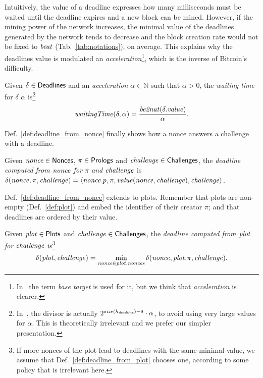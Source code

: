 %
Intuitively, the value of a deadline expresses how many milliseconds
must be waited until the deadline expires and a new block can be mined.
However, if the mining power of the network increases, the minimal value of the deadlines
generated by the network tends to decrease and the block creation rate would not be
fixed to ${\mathit{beat}}$ (Tab.~\ref{tab:notations}), on average.
This explains why the deadlines value is modulated \wrt an
\emph{acceleration}\footnote{In~\cite{SignumPlotting} the term
\emph{base target} is used for it, but we think that \emph{acceleration} is clearer.},
which is the inverse of Bitcoin's difficulty.
%
\begin{definition}\label{def:deadline_waiting_time}
  Given $\delta\in{\mathsf{Deadlines}}$ and an \emph{acceleration}
  $\alpha\in\mathbb{N}$ such that $\alpha>0$, the
  \emph{waiting time} for $\delta$ \wrt $\alpha$ is\footnote{
  In~\cite{SignumPlotting}, the divisor is actually
  $2^{{\mathit{size}}(h_{\mathit{deadline}})-8}\cdot\alpha$, to avoid using very large values for
  $\alpha$. This is theoretically irrelevant and we prefer our simpler presentation.
  }
  \[
  {\mathit{waitingTime}}(\delta,\alpha)
  =\frac{{\mathit{be2nat}}(\delta.\mathit{value})}{\alpha}.
  \]
\end{definition}
%
Def.~\ref{def:deadline_from_nonce} finally shows how a nonce answers a challenge with a deadline.
%
\begin{definition}[$\delta(\nonce,\pi,\challenge)$]\label{def:deadline_from_nonce}
  Given ${\mathit{nonce}}\in{\mathsf{Nonces}}$, $\pi\in{\mathsf{Prologs}}$ and ${\mathit{challenge}}\in{\mathsf{Challenges}}$, the
  \emph{deadline computed from ${\mathit{nonce}}$ for $\pi$ and ${\mathit{challenge}}$} is
  $\delta({\mathit{nonce}},\pi,{\mathit{challenge}})=\langle{\mathit{nonce}}.p,\pi,\mathit{value}({\mathit{nonce}},{\mathit{challenge}}),{\mathit{challenge}}\rangle$.
\end{definition}
%
Def.~\ref{def:deadline_from_nonce} extends to plots. Remember that plots are non-empty
(Def.~\ref{def:plot}) and embed the identifier of their creator $\pi$;
and that deadlines are ordered by their value.
%
\begin{definition}[$\deadline(\plot,\challenge)$]\label{def:deadline_from_plot}
  Given ${\mathit{plot}}\in{\mathsf{Plots}}$ and ${\mathit{challenge}}\in{\mathsf{Challenges}}$, the \emph{deadline computed
  from ${\mathit{plot}}$ for ${\mathit{challenge}}$} is\footnote{If more nonces of the plot lead to deadlines
  with the same minimal value, we assume that Def.~\ref{def:deadline_from_plot} chooses one,
  according to some policy that is irrelevant here.}
  \[
  \delta({\mathit{plot}},{\mathit{challenge}})=\min\limits_{{\mathit{nonce}}\in{\mathit{plot}}.{\mathit{nonces}}}\delta({\mathit{nonce}},{\mathit{plot}}.\pi,{\mathit{challenge}}).
  \]
\end{definition}
